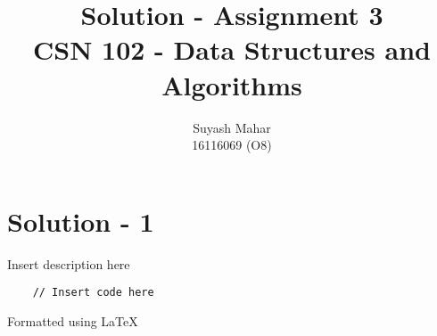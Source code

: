 \documentclass[A4]{article}
\title{Solution - Assignment 3 \\
CSN 102 - Data Structures and Algorithms}
\author{Suyash Mahar \\
16116069 (O8)}
\begin{document}
\maketitle




\vspace{5ex} 
\section*{Solution - 1}
Insert description here

\begin{lstlisting}
	// Insert code here
\end{lstlisting}

\begin{center}
Formatted using \LaTeX{}
\end{center}
\end{document}
